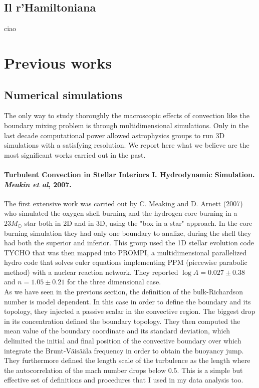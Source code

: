 \documentclass[11pt]{article}
\numberwithin{equation}{section}
\begin{document}
\subsection{Il r'Hamiltoniana}
ciao


\section{Previous works}

\subsection{Numerical simulations}

The only way to study thoroughly the macroscopic effects of convection like the boundary mixing problem is through multidimensional simulations. Only in the last decade computational power allowed astrophysics groups to run 3D simulations with a satisfying resolution. We report here what we believe are the most significant works carried out in the past. 

\paragraph{Turbulent Convection in Stellar Interiors I. Hydrodynamic Simulation. \textit{Meakin et al}, 2007.} 
The first extensive work was carried out by C. Meaking and D. Arnett (2007) who simulated the oxygen shell burning and the hydrogen core burning in a $23 M_{\odot}$ star both in 2D and in 3D, using the "box in a star" approach. In the core burning simulation they had only one boundary to analize, during the shell they had both the superior and inferior. This group used the 1D stellar evolution code TYCHO that was then mapped into PROMPI, a multidimensional parallelized hydro code that solves euler equations implementing PPM (piecewise parabolic method) with a nuclear reaction network. They reported $\log A=0.027 \pm 0.38$ and $n=1.05 \pm 0.21$ for the three dimensional case. \\
As we have seen in the previous section, the definition of the bulk-Richardson number is model dependent. In this case in order to define the boundary and its topology, they injected a passive scalar in the convective region. The biggest drop in its concentration defined the boundary topology. They then computed the mean value of the boundary coordinate and its standard deviation, which delimited the initial and final position of the convective boundary over which integrate the Brunt-Väisääla frequency in order to obtain the buoyancy jump. They furthermore defined the length scale of the turbulence as the length where the autocorrelation of the mach number drops below $0.5$. This is a simple but effective set of definitions and procedures that I used in my data analysis too. \\
\end{document}
